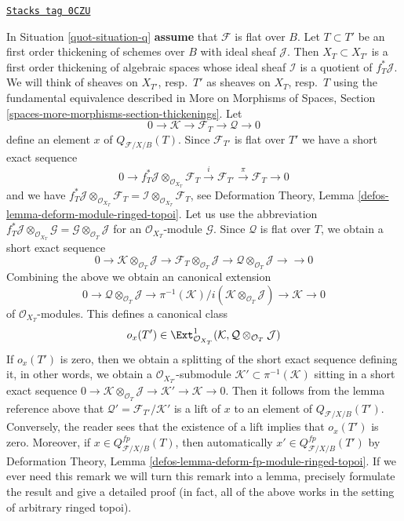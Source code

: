 \begin{remark}

\label{quot-remark-q-obs}
\href{https://stacks.math.columbia.edu/tag/0CZU}{\texttt{Stacks tag 0CZU}}

In Situation \ref{quot-situation-q} {\bf assume} that $\mathcal{F}$ is flat
over $B$. Let $T \subset T'$ be an first order
thickening of schemes over $B$ with ideal sheaf $\mathcal{J}$. Then
$X_T \subset X_{T'}$ is a first order thickening of algebraic spaces
whose ideal sheaf $\mathcal{I}$ is a quotient of $f_T^*\mathcal{J}$.
We will think of sheaves on $X_{T'}$, resp.\ $T'$ as sheaves on
$X_T$, resp.\ $T$ using the fundamental equivalence described in
More on Morphisms of Spaces, Section
\ref{spaces-more-morphisms-section-thickenings}.
Let
$$
0 \to \mathcal{K} \to \mathcal{F}_T \to \mathcal{Q} \to 0
$$
define an element $x$ of $Q_{\mathcal{F}/X/B}(T)$. Since $\mathcal{F}_{T'}$
is flat over $T'$ we have a short exact sequence
$$
0 \to f_T^*\mathcal{J} \otimes_{\mathcal{O}_{X_T}} \mathcal{F}_T
\xrightarrow{i} \mathcal{F}_{T'} \xrightarrow{\pi} \mathcal{F}_T \to 0
$$
and we have
$f_T^*\mathcal{J} \otimes_{\mathcal{O}_{X_T}} \mathcal{F}_T =
\mathcal{I} \otimes_{\mathcal{O}_{X_T}} \mathcal{F}_T$, see
Deformation Theory, Lemma \ref{defos-lemma-deform-module-ringed-topoi}.
Let us use the abbreviation
$
f_T^*\mathcal{J} \otimes_{\mathcal{O}_{X_T}} \mathcal{G} =
\mathcal{G} \otimes_{\mathcal{O}_T} \mathcal{J}
$
for an $\mathcal{O}_{X_T}$-module $\mathcal{G}$.
Since $\mathcal{Q}$ is flat over $T$, we obtain a short exact sequence
$$
0 \to
\mathcal{K} \otimes_{\mathcal{O}_T} \mathcal{J} \to
\mathcal{F}_T \otimes_{\mathcal{O}_T} \mathcal{J} \to
\mathcal{Q} \otimes_{\mathcal{O}_T} \mathcal{J} \to
\to 0
$$
Combining the above we obtain an canonical extension
$$
0 \to \mathcal{Q} \otimes_{\mathcal{O}_T} \mathcal{J} \to
\pi^{-1}(\mathcal{K})/i(\mathcal{K} \otimes_{\mathcal{O}_T} \mathcal{J}) \to
\mathcal{K} \to 0
$$
of $\mathcal{O}_{X_T}$-modules. This defines a canonical class
$$
o_x(T') \in
\Ext^1_{\mathcal{O}_{X_T}}(\mathcal{K},
\mathcal{Q} \otimes_{\mathcal{O}_T} \mathcal{J})
$$
If $o_x(T')$ is zero, then we obtain a splitting of the short
exact sequence defining it, in other words, we obtain a
$\mathcal{O}_{X_{T'}}$-submodule
$\mathcal{K}' \subset \pi^{-1}(\mathcal{K})$ sitting in a short
exact sequence
$0 \to \mathcal{K} \otimes_{\mathcal{O}_T} \mathcal{J} \to
\mathcal{K}' \to \mathcal{K} \to 0$.
Then it follows from the lemma reference above that
$\mathcal{Q}' = \mathcal{F}_{T'}/\mathcal{K}'$
is a lift of $x$ to an element of $Q_{\mathcal{F}/X/B}(T')$.
Conversely, the reader sees that the existence of
a lift implies that $o_x(T')$ is zero. Moreover, if
$x \in Q_{\mathcal{F}/X/B}^{fp}(T)$, then automatically
$x' \in Q_{\mathcal{F}/X/B}^{fp}(T')$ by
Deformation Theory, Lemma \ref{defos-lemma-deform-fp-module-ringed-topoi}.
If we ever need this
remark we will turn this remark into a lemma, precisely formulate
the result and give a detailed proof (in fact, all of the above
works in the setting of arbitrary ringed topoi).
\end{remark}

